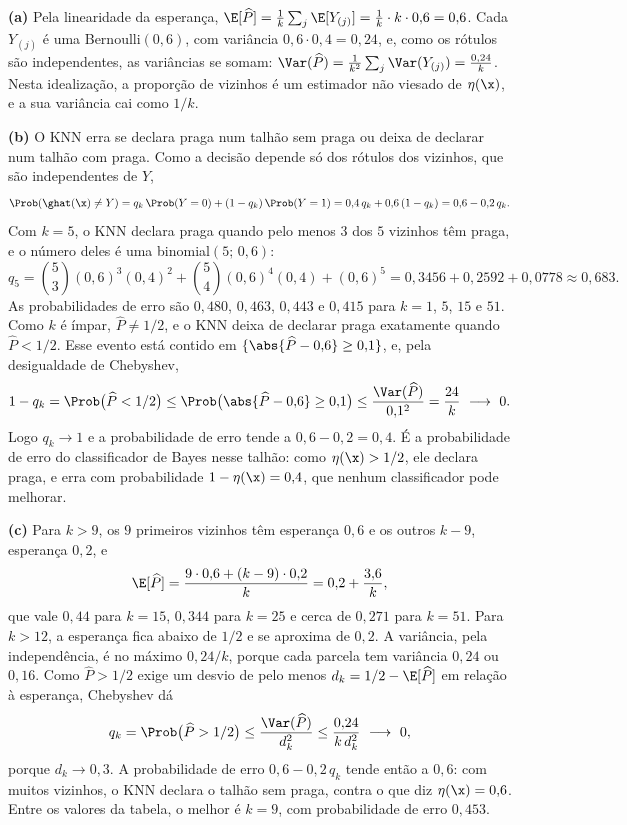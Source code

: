\begin{solucao}
\textbf{(a)} Pela linearidade da esperança,
$\E[\widehat P]=\frac1k\sum_j\E[Y_{(j)}]=\frac1k\cdot k\cdot0{,}6=0{,}6$. Cada $Y_{(j)}$ é uma
Bernoulli$(0{,}6)$, com variância $0{,}6\cdot0{,}4=0{,}24$, e, como os rótulos são independentes,
as variâncias se somam:
$\Var(\widehat P)=\frac1{k^2}\sum_j\Var(Y_{(j)})=\frac{0{,}24}{k}$. Nesta idealização, a
proporção de vizinhos é um estimador não viesado de $\eta(\x)$, e a sua variância cai como
$1/k$.

\smallskip
\textbf{(b)} O KNN erra se declara praga num talhão sem praga ou deixa de declarar num talhão
com praga. Como a decisão depende só dos rótulos dos vizinhos, que são independentes de $Y$,
\[
  \Prob(\ghat(\x)\ne Y)=q_k\,\Prob(Y=0)+(1-q_k)\,\Prob(Y=1)=0{,}4\,q_k+0{,}6\,(1-q_k)=0{,}6-0{,}2\,q_k .
\]
Com $k=5$, o KNN declara praga quando pelo menos $3$ dos $5$ vizinhos têm praga, e o número
deles é uma binomial$(5;\,0{,}6)$:
\[
  q_5=\binom53(0{,}6)^3(0{,}4)^2+\binom54(0{,}6)^4(0{,}4)+(0{,}6)^5
     =0{,}3456+0{,}2592+0{,}0778\approx0{,}683 .
\]
As probabilidades de erro são $0{,}480$, $0{,}463$, $0{,}443$ e $0{,}415$ para $k=1$, $5$, $15$ e
$51$. Como $k$ é ímpar, $\widehat P\ne1/2$, e o KNN deixa de declarar praga exatamente
quando $\widehat P<1/2$. Esse evento está contido em
$\{\abs{\widehat P-0{,}6}\ge0{,}1\}$, e, pela desigualdade de Chebyshev,
\[
  1-q_k=\Prob\big(\widehat P<1/2\big)\le\Prob\big(\abs{\widehat P-0{,}6}\ge0{,}1\big)
  \le\frac{\Var(\widehat P)}{0{,}1^2}=\frac{24}{k}\ \longrightarrow\ 0 .
\]
Logo $q_k\to1$ e a probabilidade de erro tende a $0{,}6-0{,}2=0{,}4$. É a probabilidade de
erro do classificador de Bayes nesse talhão: como $\eta(\x)>1/2$, ele declara praga, e erra
com probabilidade $1-\eta(\x)=0{,}4$, que nenhum classificador pode melhorar.

\smallskip
\textbf{(c)} Para $k>9$, os $9$ primeiros vizinhos têm esperança $0{,}6$ e os outros $k-9$,
esperança $0{,}2$, e
\[
  \E[\widehat P]=\frac{9\cdot0{,}6+(k-9)\cdot0{,}2}{k}=0{,}2+\frac{3{,}6}{k} ,
\]
que vale $0{,}44$ para $k=15$, $0{,}344$ para $k=25$ e cerca de $0{,}271$ para $k=51$. Para
$k>12$, a esperança fica abaixo de $1/2$ e se aproxima de $0{,}2$. A variância, pela
independência, é no máximo $0{,}24/k$, porque cada parcela tem variância $0{,}24$ ou $0{,}16$.
Como $\widehat P>1/2$ exige um desvio de pelo menos $d_k=1/2-\E[\widehat P]$ em relação à
esperança, Chebyshev dá
\[
  q_k=\Prob\big(\widehat P>1/2\big)\le\frac{\Var(\widehat P)}{d_k^2}\le\frac{0{,}24}{k\,d_k^2}\ \longrightarrow\ 0 ,
\]
porque $d_k\to0{,}3$. A probabilidade de erro $0{,}6-0{,}2\,q_k$ tende então a $0{,}6$: com
muitos vizinhos, o KNN declara o talhão sem praga, contra o que diz $\eta(\x)=0{,}6$. Entre os
valores da tabela, o melhor é $k=9$, com probabilidade de erro $0{,}453$.


\end{solucao}
